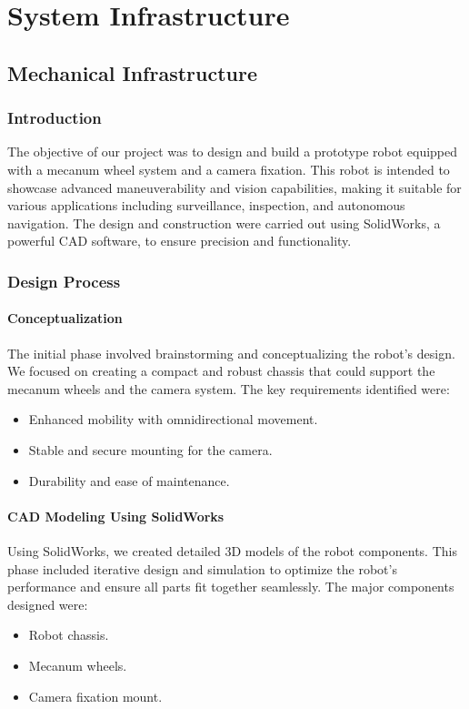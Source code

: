 \part{System Infrastructure}
\newpage
\chapter{Mechanical Infrastructure}

\section{Introduction}
The objective of our project was to design and build a prototype robot equipped with a mecanum
wheel system and a camera fixation. This robot is intended to showcase advanced maneuverability
and vision capabilities, making it suitable for various applications including surveillance,
inspection, and autonomous navigation. The design and construction were carried out using
SolidWorks, a powerful CAD software, to ensure precision and
functionality.

\section{Design Process} 
\subsection{Conceptualization} 
The initial phase involved brainstorming and conceptualizing the robot's design. We focused on
creating a compact and robust chassis that could support the mecanum wheels and the camera
system. The key requirements identified were:
\begin{itemize}
	\item Enhanced mobility with omnidirectional movement.
	\item Stable and secure mounting for the camera.
	\item Durability and ease of maintenance.
\end{itemize}


\subsection{CAD Modeling Using SolidWorks}
Using SolidWorks, we created detailed 3D models of the robot components. This phase included
iterative design and simulation to optimize the robot's performance and ensure all parts fit together
seamlessly. The major components designed were:
\begin{itemize}
	\item Robot chassis.
	\item Mecanum wheels.
	\item Camera fixation mount.
\end{itemize}

